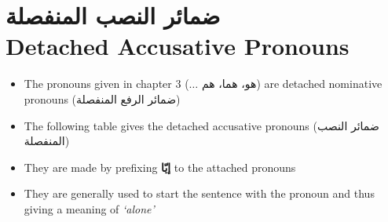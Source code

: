 \chapter*{\textarabic{ضمائر النصب المنفصلة} \\ {Detached Accusative Pronouns}}

\begin{itemize}	    \setlength{\itemsep}{5pt}
	\item The pronouns given in chapter 3 ($\dots$ \textarabic{هو، هما، هم}) are detached nominative pronouns
	 (\textarabic{ضمائر الرفع المنفصلة})
	\item The following table gives the detached accusative pronouns (\textarabic{ضمائر النصب المنفصلة})
	\item They are made by prefixing \textbf{\textarabic{إيّا}} to the attached pronouns
	\item They are generally used to start the sentence with the pronoun and thus giving a meaning of \textit{`alone'}
	
\end{itemize}

